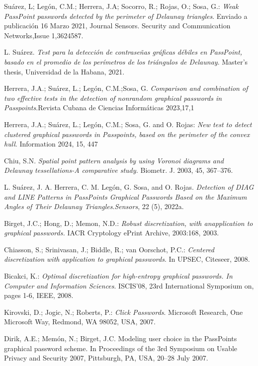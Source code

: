 \documentclass[12pt]{report}
\begin{document}
\begin{thebibliography}{9}
{		Suárez, L; Legón, C.M.; Herrera, J.A; Socorro, R.; Rojas, O.; Sosa,
		G.: \textit{Weak PassPoint passwords detected by the perimeter of Delaunay triangles}. Enviado a publicación 16 Marzo 2021, Journal Sensors. Security and Communication Networks,Issue 1,3624587.
		
		L. Suárez. \textit{Test para la detección de contraseñas gráficas débiles en PassPoint, basado en el promedio de los	perímetros de los triángulos de Delaunay}. Master’s thesis, Universidad de la Habana, 2021.
		
		Herrera, J.A.; Suárez, L.; Legón, C.M.;Sosa, G.
		\textit{Comparison and combination of two effective tests in the detection of nonrandom graphical
		passwords in Passpoints}.Revista Cubana de Ciencias Informáticas 2023,17,1
		
		 Herrera, J.A.; Suárez, L.; Legón, C.M.; Sosa, G. and O. Rojas: \textit{New test to detect clustered graphical passwords   in Passpoints, based on the perimeter of the convex hull}. Information 2024, 15, 447
		
		 Chiu, S.N.\textit{ Spatial point pattern analysis by using Voronoi diagrams and Delaunay tessellations-A comparative study.} Biometr. J.
		2003, 45, 367–376.
		
		 L. Suárez, J. A. Herrera, C. M. Legón, G. Sosa, and O. Rojas. \textit{Detection of DIAG and LINE Patterns in PassPoints Graphical Passwords Based on the Maximum Angles of Their Delaunay Triangles}.\textit{Sensors}, 22
		(5), 2022a.
		
		 Birget, J.C.; Hong, D.; Memon, N.D.: \textit{Robust discretization, with anapplication to graphical passwords.} IACR Cryptology ePrint Archive,
		2003:168, 2003.
		
		Chiasson, S.; Srinivasan, J.; Biddle, R.; van Oorschot, P.C.: \textit{Centered discretization with application to graphical passwords}. In UPSEC,
		Citeseer, 2008.
		
		Bicakci, K.: \textit{Optimal discretization for high-entropy graphical passwords. In Computer and Information Sciences}. ISCIS'08, 23rd International
		Symposium on, pages 1-6, IEEE, 2008.
		
		Kirovski, D.; Jogic, N.; Roberts, P.: \textit{Click Passwords}. Microsoft Research, One Microsoft Way, Redmond, WA 98052, USA, 2007.
		
		Dirik, A.E.; Memón, N.; Birget, J.C. Modeling user choice in the PassPoints graphical password scheme. In Proceedings of the 3rd
		Symposium on Usable Privacy and Security 2007, Pittsburgh, PA, USA, 20–28 July 2007.
		
}
\end{thebibliography}
\end{document}

